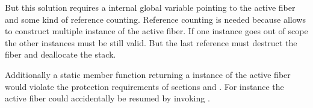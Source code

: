 But this solution requires a internal global variable pointing to the active
fiber and some kind of reference counting. Reference counting is needed because
 allows to construct multiple instance of the active
fiber. If one instance goes out of scope the other instances must be still
valid. But the last reference must destruct the fiber and deallocate the stack.

Additionally a static member function returning a instance of the active fiber
would violate the protection requirements of sections  and
. For instance the active fiber could accidentally be
resumed by invoking \resume.

